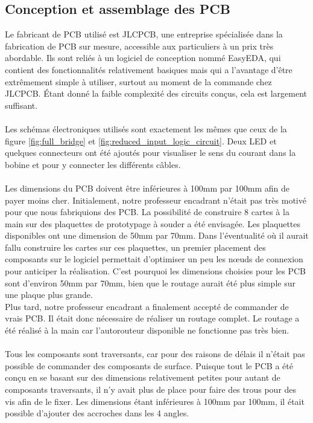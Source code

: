 \documentclass{article}
\begin{document}
 \subsection{Conception et assemblage des PCB}
Le fabricant de PCB utilisé est JLCPCB, une entreprise spécialisée dans la fabrication de PCB sur mesure, accessible aux particuliers à un prix très abordable. Ils sont reliés à un logiciel de conception nommé EasyEDA, qui contient des fonctionnalités relativement basiques mais qui a l'avantage d'être extrêmement simple à utiliser, surtout au moment de la commande chez JLCPCB. Étant donné la faible complexité des circuits conçus, cela est largement suffisant.
\\\\
Les schémas électroniques utilisés sont exactement les mêmes que ceux de la figure \ref{fig:full_bridge} et \ref{fig:reduced_input_logic_circuit}. Deux LED et quelques connecteurs ont été ajoutés pour visualiser le sens du courant dans la bobine et pour y connecter les différents câbles.
\\\\
Les dimensions du PCB doivent être inférieures à 100mm par 100mm afin de payer moins cher. Initialement, notre professeur encadrant n'était pas très motivé pour que nous fabriquions des PCB. La possibilité de construire 8 cartes à la main sur des plaquettes de prototypage à souder a été envisagée. Les plaquettes disponibles ont une dimension de 50mm par 70mm. Dans l'éventualité où il aurait fallu construire les cartes sur ces plaquettes, un premier placement des composants sur le logiciel permettait d'optimiser un peu les nœuds de connexion pour anticiper la réalisation. C'est pourquoi les dimensions choisies pour les PCB sont d'environ 50mm par 70mm, bien que le routage aurait été plus simple sur une plaque plus grande. \\
Plus tard, notre professeur encadrant a finalement accepté de commander de vrais PCB. Il était donc nécessaire de réaliser un routage complet. Le routage a été réalisé à la main car l'autorouteur disponible ne fonctionne pas très bien. \\\\
Tous les composants sont traversants, car pour des raisons de délais il n'était pas possible de commander des composants de surface. Puisque tout le PCB a été conçu en se basant sur des dimensions relativement petites pour autant de composants traversants, il n'y avait plus de place pour faire des trous pour des vis afin de le fixer. Les dimensions étant inférieures à 100mm par 100mm, il était possible d'ajouter des accroches dans les 4 angles.
\end{document}
